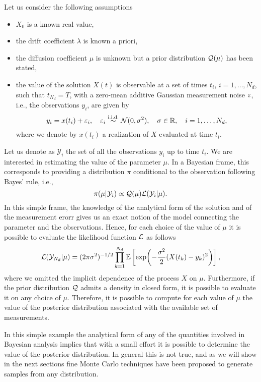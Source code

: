 Let us consider the following assumptions
\begin{itemize}
	\item $X_0$ is a known real value, 
	\item the drift coefficient $\lambda$ is known a priori,
	\item the diffusion coefficient $\mu$ is unknown but a prior distribution $\mathcal{Q}(\mu)$ has been stated,
	\item the value of the solution $X(t)$ is observable at a set of times $t_i$, $i = 1, \ldots, N_d$, such that $t_{N_d} = T$, with a zero-mean additive Gaussian measurement noise $\varepsilon$, i.e., the observations $y_i$, are given by
	\begin{equation}
		y_i = x(t_i) + \varepsilon_i, \quad \varepsilon_i \stackrel{\text{i.i.d.}}{\sim} \mathcal{N}(0, \sigma^2), \quad  \sigma \in \mathbb{R}, \quad i = 1, \ldots, N_d,
	\end{equation}  
	where we denote by $x(t_i)$ a realization of $X$ evaluated at time $t_i$.
\end{itemize}
Let us denote as $\mathcal{Y}_i$ the set of all the observations $y_i$ up to time $t_i$. We are interested in estimating the value of the parameter $\mu$. In a Bayesian frame, this corresponds to providing a distribution $\pi$ conditional to the observation following Bayes' rule, i.e.,
\begin{equation}
	\pi(\mu|\mathcal{Y}_i) \propto \mathcal{Q}(\mu) \mathcal{L}(\mathcal{Y}_i|\mu).
\end{equation}
In this simple frame, the knowledge of the analytical form of the solution and of the measurement erorr gives us an exact notion of the model connecting the parameter and the observations. Hence, for each choice of the value of $\mu$ it is possible to evaluate the likelihood function $\mathcal{L}$ as follows
\begin{equation}
	\mathcal{L}(\mathcal{Y}_{N_d}|\mu) = (2\pi\sigma^2)^{-1/2}\prod_{k = 1}^{N_d}\mathbb{E}\left[\exp(-\frac{\sigma^2}{2}(X(t_k) - y_k)^2)\right],
\end{equation}
where we omitted the implicit dependence of the process $X$ on $\mu$. Furthermore, if the prior distribution $\mathcal{Q}$ admits a density in closed form, it is possible to evaluate it on any choice of $\mu$. Therefore, it is possible to compute for each value of $\mu$ the value of the posterior distribution associated with the available set of measurements. 

In this simple example the analytical form of any of the quantities involved in Bayesian analysis implies that with a small effort it is possible to determine the value of the posterior distribution. In general this is not true, and as we will show in the next sections fine Monte Carlo techniques have been proposed to generate samples from any distribution. 

